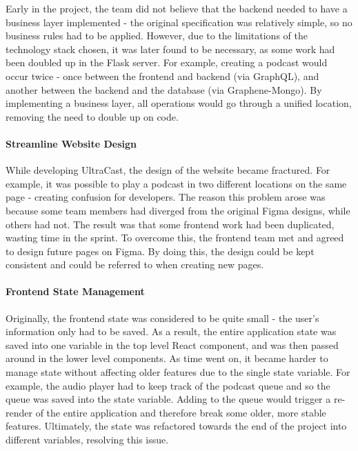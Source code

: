\documentclass[../report.tex]{subfiles}
\begin{document}
Early in the project, the team did not believe that the backend needed to have a business layer implemented - the original specification was relatively simple, so no business rules had to be applied.
However, due to the limitations of the technology stack chosen, it was later found to be necessary, as some work had been doubled up in the Flask server.
For example, creating a podcast would occur twice - once between the frontend and backend (via GraphQL), and another between the backend and the database (via Graphene-Mongo).
By implementing a business layer, all operations would go through a unified location, removing the need to double up on code.

\paragraph{Streamline Website Design}

While developing UltraCast, the design of the website became fractured.
For example, it was possible to play a podcast in two different locations on the same page - creating confusion for developers.
The reason this problem arose was because some team members had diverged from the original Figma designs, while others had not.
The result was that some frontend work had been duplicated, wasting time in the sprint.
To overcome this, the frontend team met and agreed to design future pages on Figma.
By doing this, the design could be kept consistent and could be referred to when creating new pages.

\paragraph{Frontend State Management}

Originally, the frontend state was considered to be quite small - the user's information only had to be saved.
As a result, the entire application state was saved into one variable in the top level React component, and was then passed around in the lower level components.
As time went on, it became harder to manage state without affecting older features due to the single state variable.
For example, the audio player had to keep track of the podcast queue and so the queue was saved into the state variable.
Adding to the queue would trigger a re-render of the entire application and therefore break some older, more stable features.
Ultimately, the state was refactored towards the end of the project into different variables, resolving this issue.
\end{document}
